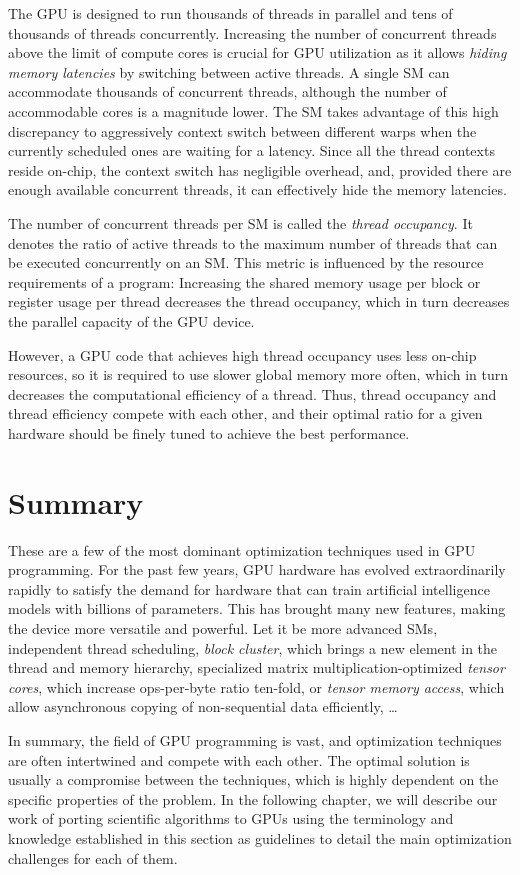The GPU is designed to run thousands of threads in parallel and tens of thousands of threads concurrently. Increasing the number of concurrent threads above the limit of compute cores is crucial for GPU utilization as it allows \emph{hiding memory latencies} by switching between active threads. A single SM can accommodate thousands of concurrent threads, although the number of accommodable cores is a magnitude lower. The SM takes advantage of this high discrepancy to aggressively context switch between different warps when the currently scheduled ones are waiting for a latency. Since all the thread contexts reside on-chip, the context switch has negligible overhead, and, provided there are enough available concurrent threads, it can effectively hide the memory latencies.

The number of concurrent threads per SM is called the \emph{thread occupancy}. It denotes the ratio of active threads to the maximum number of threads that can be executed concurrently on an SM. This metric is influenced by the resource requirements of a program: Increasing the shared memory usage per block or register usage per thread decreases the thread occupancy, which in turn decreases the parallel capacity of the GPU device.

However, a GPU code that achieves high thread occupancy uses less on-chip resources, so it is required to use slower global memory more often, which in turn decreases the computational efficiency of a thread. Thus, thread occupancy and thread efficiency compete with each other, and their optimal ratio for a given hardware should be finely tuned to achieve the best performance.

\section{Summary}

These are a few of the most dominant optimization techniques used in GPU programming. For the past few years, GPU hardware has evolved extraordinarily rapidly to satisfy the demand for hardware that can train artificial intelligence models with billions of parameters. This has brought many new features, making the device more versatile and powerful. Let it be more advanced SMs, independent thread scheduling, \emph{block cluster}, which brings a new element in the thread and memory hierarchy, specialized matrix multiplication-optimized \emph{tensor cores}, which increase ops-per-byte ratio ten-fold, or \emph{tensor memory access}, which allow asynchronous copying of non-sequential data efficiently, \dots

In summary, the field of GPU programming is vast, and optimization techniques are often intertwined and compete with each other. The optimal solution is usually a compromise between the techniques, which is highly dependent on the specific properties of the problem. In the following chapter, we will describe our work of porting scientific algorithms to GPUs using the terminology and knowledge established in this section as guidelines to detail the main optimization challenges for each of them.